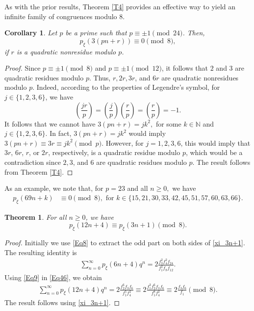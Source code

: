 \documentclass[12pt]{article}
\newtheorem{theorem}{Theorem}[section]
\newtheorem{corollary}{Corollary}[section]
\begin{document}
As with the prior results, Theorem \ref{T4} provides an effective way to yield an infinite family of congruences modulo $8$.


\begin{corollary} Let $p$ be a prime such that $p \equiv \pm 1 \pmod{24}$. Then, 
$$p_{\xi}(3(pn+r)) \equiv 0 \pmod{8},$$
if $r$ is a quadratic nonresidue modulo $p$.
\end{corollary}

\begin{proof}
Since $p \equiv \pm 1 \pmod{8}$ and $p \equiv \pm 1 \pmod{12}$, it follows that $2$ and $3$ are quadratic 
residues modulo $p$. Thus, $r, 2r, 3r$, and $6r$ are quadratic 
nonresidues modulo $p$. Indeed, according to the properties of Legendre's symbol, for $j\in \{1,2,3,6\}$, we have
$$\left( \frac{jr}{p}\right) = \left( \frac{j}{p}\right)\left( \frac{r}{p}\right) = \left( \frac{r}{p}\right) = -1.$$
It follows that we cannot have 
$3(pn+r) = jk^2,$ for some $k \in \mathbb{N}$ and $j \in \{ 1, 2, 3, 6 \}$. In fact, 
$3(pn+r) = jk^2$ would imply 
$3(pn+r) \equiv 3r \equiv jk^2 \pmod{p}$. However, for $j = 1, 2, 3, 6$, this would imply that $3r$, $6r$, $r$, or $2r$, respectively, is a quadratic residue modulo $p$, which would be a contradiction since $2, 3$, and $6$ are quadratic residues modulo $p$. The result follows from Theorem \ref{T4}.
\end{proof}%

As an example, we note that, for $p=23$ and all $n\geq 0,$ we have
\begin{align*}
p_{\xi}(69n+k) & \equiv 0 \pmod{8}, \mbox{ for } k \in \{ 15, 21, 30, 33, 42, 45, 51, 57, 60, 63, 66 \}.
\end{align*}


\begin{theorem} For all $n \geq 0$, we have 
	$$p_{\xi}(12n+4) \equiv p_{\xi}(3n+1) \pmod{8}.$$
\label{T7}
\end{theorem}
	
\begin{proof}
	Initially we use \eqref{Eq8} to extract the odd part on both sides of \eqref{xi_3n+1}. The resulting identity is
	\begin{align}
	\sum_{n=0}^{\infty} p_{\xi}(6n+4)q^n = 2\frac{f_{3}^2f_4^2f_{24}}{f_{1}^2f_8f_{12}}.
	\label{Eq46}
	\end{align}
	Using \eqref{Eq9} in \eqref{Eq46}, we obtain 
	\begin{align*}
	\sum_{n=0}^{\infty} p_{\xi}(12n+4)q^n = 2\frac{f_{2}^6f_3f_{6}}{f_{1}^5f_4^2} \equiv 2\frac{f_1^3f_{2}^6f_3f_{6}}{f_{1}^8f_4^2} \equiv 2\frac{f_3f_{6}}{f_{1}} \pmod{8}.
	\end{align*}
	The result follows using \eqref{xi_3n+1}.
\end{proof}
	
\end{document}
